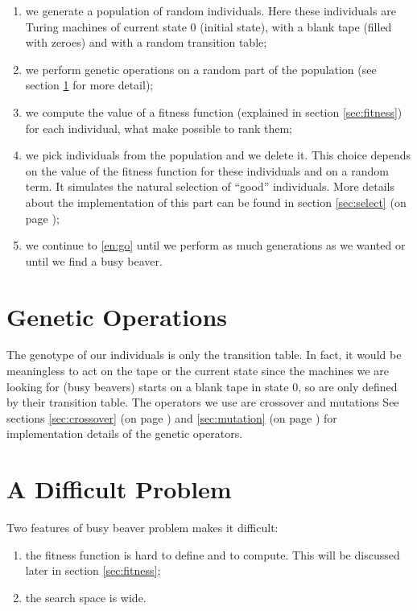 \documentclass{report}
\begin{document}
\begin{enumerate}
\item we generate a population of random individuals. Here these individuals are Turing machines of current state 0 (initial state), with a blank tape (filled with zeroes) and with a random transition table;
\item \label{en:go} we perform genetic operations on a random part of the population (see section \ref{sec:go} for more detail);
\item we compute the value of a fitness function (explained in section \ref{sec:fitness}) for each individual, what make possible to rank them;
\item we pick individuals from the population and we delete it. This choice depends on the value of the fitness function for these individuals and on a random term. It simulates the natural selection of ``good'' individuals. More details about the implementation of this part can be found in section \ref{sec:select} (on page \pageref{sec:select});
\item we continue to \ref{en:go} until we perform as much generations as we wanted or until we find a busy beaver.
\end{enumerate}

\section{Genetic Operations}
\label{sec:go}

The genotype of our individuals is only the transition table. In fact, it would be meaningless to act on the tape or the current state since the machines we are looking for (busy beavers) starts on a blank tape in state 0, so are only defined by their transition table.
The operators we use are crossover and mutations
See sections \ref{sec:crossover} (on page \pageref{sec:crossover}) and \ref{sec:mutation} (on page \pageref{sec:mutation}) for implementation details of the genetic operators. 

\section{A Difficult Problem}

Two features of busy beaver problem makes it difficult:
\begin{enumerate}
\item the fitness function is hard to define and to compute. This will be discussed later in section \ref{sec:fitness};
\item \label{en:se} the search space is wide.
\end{enumerate}
\end{document}
